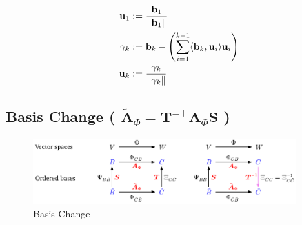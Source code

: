 \[
\begin{aligned}
    \displaystyle
    \mathbf{u}_1 &:= \dfrac{\mathbf{b}_1}{\left\| \mathbf{b}_1 \right\|}\\
    \gamma_k &:= \mathbf{b}_k - \left( \sum_{i=1}^{k-1} \langle \mathbf{b}_k, \mathbf{u}_i \rangle \mathbf{u}_i \right)\\
    \mathbf{u}_k &:= \dfrac{\gamma_k}{\left\| \gamma_k \right\|}\\
\end{aligned}
\]




\subsection{Basis Change ( $\mathbf{\tilde{A}}_\Phi = \mathbf{T^{-\top}A}_\Phi \mathbf{S}$ ) \cite{mfml-1}}\label{Basis Change}

\begin{figure}[h]
    \centering
    \includegraphics[width=\linewidth, height=2.5cm, keepaspectratio]{Pictures/maths/basis-change.png}
    \caption{Basis Change}
\end{figure}

